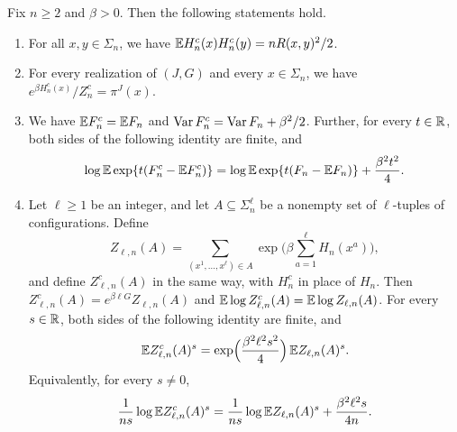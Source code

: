 \begin{lemma}\label{lem:model-completion}
Fix $n\ge2$ and $\beta>0$. Then the following statements hold.
\begin{enumerate}[label=(\alph*)]
\item For all $x,y\in\Sigma_n$, we have $\mathbb E H^c_n(x)H^c_n(y)=nR(x,y)^2/2$.
\item For every realization of $(J,G)$ and every $x\in\Sigma_n$, we have $e^{\beta H_n^c(x)}/Z_n^c=\pi^J(x)$.
\item We have $\mathbb E F_n^c=\mathbb E F_n$ and $\operatorname{Var} F_n^c=\operatorname{Var} F_n+\beta^2/2$. Further, for every $t\in\mathbb R$, both sides of the following identity are finite, and
\begin{equation}\label{eq:model-completion-laplace}
 \log\mathbb E\exp\{t(F_n^c-\mathbb E F_n^c)\}=\log\mathbb E\exp\{t(F_n-\mathbb E F_n)\}+\frac{\beta^2t^2}{4}.
\end{equation}
\item Let $\ell\ge1$ be an integer, and let $A\subseteq\Sigma_n^\ell$ be a nonempty set of $\ell$-tuples of configurations. Define
\[
 Z_{\ell,n}(A)=\sum_{(x^1,\dots,x^\ell)\in A}\exp\biggl(\beta\sum_{a=1}^\ell H_n(x^a)\biggr),
\]
and define $Z_{\ell,n}^c(A)$ in the same way, with $H_n^c$ in place of $H_n$. Then $Z^c_{\ell,n}(A)=e^{\beta\ell G}Z_{\ell,n}(A)$ and $\mathbb E\log Z^c_{\ell,n}(A)=\mathbb E\log Z_{\ell,n}(A)$. For every $s\in\mathbb R$, both sides of the following identity are finite, and
\begin{equation}\label{eq:model-completion-moment}
 \mathbb E Z_{\ell,n}^c(A)^s=\exp\Bigl(\frac{\beta^2\ell^2s^2}{4}\Bigr)\,\mathbb E Z_{\ell,n}(A)^s.
\end{equation}
Equivalently, for every $s\neq0$,
\[
 \frac1{ns}\log\mathbb E Z_{\ell,n}^c(A)^s=\frac1{ns}\log\mathbb E Z_{\ell,n}(A)^s+\frac{\beta^2\ell^2s}{4n}.
\]
\end{enumerate}
\end{lemma}

